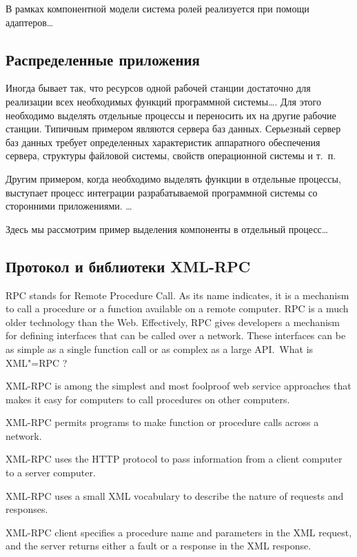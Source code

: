 \documentclass[a4paper,openany,twoside,draft]{book}
\begin{document}
В рамках компонентной модели система ролей реализуется при помощи адаптеров\ldots{}

\subsection{Распределенные приложения}
\label{sec:distributedapps}

Иногда бывает так, что ресурсов одной рабочей станции достаточно для реализации всех необходимых функций программной системы\ldots{}. Для этого необходимо выделять отдельные процессы и переносить их на другие рабочие станции.  Типичным примером являются сервера баз данных.  Серьезный сервер баз данных требует определенных характеристик аппаратного обеспечения сервера, структуры файловой системы, свойств операционной системы и т.~п.

Другим примером, когда необходимо выделять функции в отдельные процессы, выступает процесс интеграции разрабатываемой программной системы со сторонними приложениями.  \ldots{}

Здесь мы рассмотрим пример выделения компоненты в отдельный процесс\ldots{}

\subsection{Протокол и библиотеки XML-RPC}
\label{sec:xmlrpc}

RPC stands for Remote Procedure Call. As its name indicates, it is a mechanism to call a procedure or a function available on a remote computer. RPC is a much older technology than the Web. Effectively, RPC gives developers a mechanism for defining interfaces that can be called over a network. These interfaces can be as simple as a single function call or as complex as a large API.~What is XML"=RPC ?

XML-RPC is among the simplest and most foolproof web service approaches that makes it easy for computers to call procedures on other computers.

    XML-RPC permits programs to make function or procedure calls across a network.

    XML-RPC uses the HTTP protocol to pass information from a client computer to a server computer.

    XML-RPC uses a small XML vocabulary to describe the nature of requests and responses.

    XML-RPC client specifies a procedure name and parameters in the XML request, and the server returns either a fault or a response in the XML response.
\end{document}
